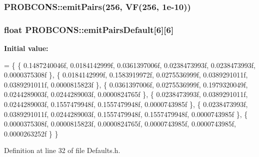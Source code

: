 \hypertarget{namespace_p_r_o_b_c_o_n_s_ae28575916501eeab36245ba0624d0640}{
\subsubsection[{emit\+Pairs}]{ P\+R\+O\+B\+C\+O\+N\+S\+::emit\+Pairs(256, {\bf V\+F}(256, 1e-\/10))}}\label{namespace_p_r_o_b_c_o_n_s_ae28575916501eeab36245ba0624d0640}
\hypertarget{namespace_p_r_o_b_c_o_n_s_a7b7f8e2ed1d48ae7f4003a455d3f7150}{
\subsubsection[{emit\+Pairs\+Default}]{\setlength{\rightskip}{0pt plus 5cm}float P\+R\+O\+B\+C\+O\+N\+S\+::emit\+Pairs\+Default\mbox{[}6\mbox{]}\mbox{[}6\mbox{]}}}\label{namespace_p_r_o_b_c_o_n_s_a7b7f8e2ed1d48ae7f4003a455d3f7150}
{\bfseries Initial value\+:}
\begin{DoxyCode}
= \{
  \{ 0.1487240046f, 0.0184142999f, 0.0361397006f, 0.0238473993f, 0.0238473993f, 0.0000375308f \},
  \{ 0.0184142999f, 0.1583919972f, 0.0275536999f, 0.0389291011f, 0.0389291011f, 0.0000815823f \},
  \{ 0.0361397006f, 0.0275536999f, 0.1979320049f, 0.0244289003f, 0.0244289003f, 0.0000824765f \},
  \{ 0.0238473993f, 0.0389291011f, 0.0244289003f, 0.1557479948f, 0.1557479948f, 0.0000743985f \},
  \{ 0.0238473993f, 0.0389291011f, 0.0244289003f, 0.1557479948f, 0.1557479948f, 0.0000743985f \},
  \{ 0.0000375308f, 0.0000815823f, 0.0000824765f, 0.0000743985f, 0.0000743985f, 0.0000263252f \}
\}
\end{DoxyCode}


Definition at line 32 of file Defaults.\+h.

